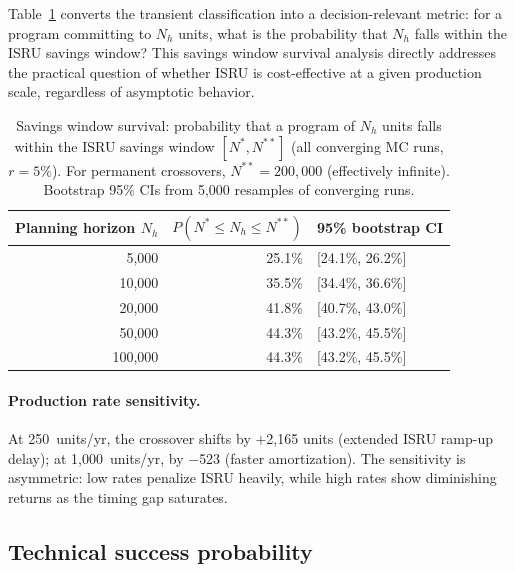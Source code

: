 \documentclass[preprint,12pt]{elsarticle}
\begin{document}
Table~\ref{tab:savings_survival} converts the transient classification into a decision-relevant metric: for a program committing to $N_h$ units, what is the probability that $N_h$ falls within the ISRU savings window? This savings window survival analysis directly addresses the practical question of whether ISRU is cost-effective at a given production scale, regardless of asymptotic behavior.

\begin{table}[htbp]
\centering
\caption{Savings window survival: probability that a program of $N_h$ units falls within the ISRU savings window $[N^*, N^{**}]$ (all converging MC runs, $r = 5\%$). For permanent crossovers, $N^{**} = 200{,}000$ (effectively infinite). Bootstrap 95\% CIs from 5{,}000 resamples of converging runs.}
\label{tab:savings_survival}
\small
\begin{tabular}{@{}rrl@{}}
\toprule
Planning horizon $N_h$ & $P(N^* \leq N_h \leq N^{**})$ & 95\% bootstrap CI \\
\midrule
5{,}000   & 25.1\% & [24.1\%, 26.2\%] \\
10{,}000  & 35.5\% & [34.4\%, 36.6\%] \\
20{,}000  & 41.8\% & [40.7\%, 43.0\%] \\
50{,}000  & 44.3\% & [43.2\%, 45.5\%] \\
100{,}000 & 44.3\% & [43.2\%, 45.5\%] \\
\bottomrule
\end{tabular}
\end{table}

\paragraph{Production rate sensitivity.} At 250~units/yr, the crossover shifts by $+$2{,}165 units (extended ISRU ramp-up delay); at 1{,}000~units/yr, by $-$523 (faster amortization). The sensitivity is asymmetric: low rates penalize ISRU heavily, while high rates show diminishing returns as the timing gap saturates.

\subsection{Technical success probability}
\label{sec:success_probability}
\end{document}
